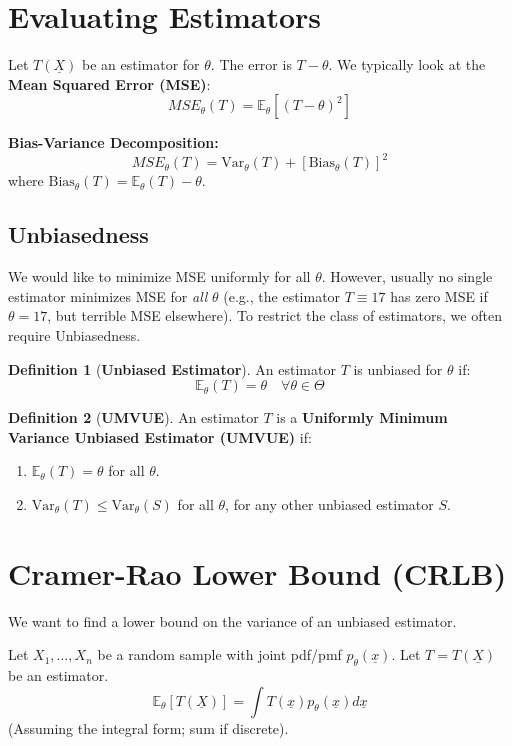 \documentclass[12pt, a4paper]{article}
\theoremstyle{definition}
\newtheorem{definition}{Definition}
\newcommand{\E}{\mathbb{E}}
\newcommand{\Var}{\text{Var}}
\newcommand{\xvec}{\underline{x}}
\newcommand{\Xvec}{\underline{X}}
\begin{document}
\section{Evaluating Estimators}

Let $T(\Xvec)$ be an estimator for $\theta$. The error is $T - \theta$.
We typically look at the \textbf{Mean Squared Error (MSE)}:
$$ MSE_\theta(T) = \E_\theta[(T - \theta)^2] $$

\textbf{Bias-Variance Decomposition:}
$$ MSE_\theta(T) = \Var_\theta(T) + [\text{Bias}_\theta(T)]^2 $$
where $\text{Bias}_\theta(T) = \E_\theta(T) - \theta$.

\subsection{Unbiasedness}
We would like to minimize MSE uniformly for all $\theta$. However, usually no single estimator minimizes MSE for \textit{all} $\theta$ (e.g., the estimator $T \equiv 17$ has zero MSE if $\theta=17$, but terrible MSE elsewhere).
To restrict the class of estimators, we often require Unbiasedness.

\begin{definition}[\textbf{Unbiased Estimator}]
An estimator $T$ is unbiased for $\theta$ if:
$$ \E_\theta(T) = \theta \quad \forall \theta \in \Theta $$
\end{definition}

\begin{definition}[\textbf{UMVUE}]
An estimator $T$ is a \textbf{Uniformly Minimum Variance Unbiased Estimator (UMVUE)} if:
\begin{enumerate}
    \item $\E_\theta(T) = \theta$ for all $\theta$.
    \item $\Var_\theta(T) \le \Var_\theta(S)$ for all $\theta$, for any other unbiased estimator $S$.
\end{enumerate}
\end{definition}

\section{Cramer-Rao Lower Bound (CRLB)}
We want to find a lower bound on the variance of an unbiased estimator.

Let $X_1, \dots, X_n$ be a random sample with joint pdf/pmf $p_\theta(\xvec)$.
Let $T = T(\Xvec)$ be an estimator.
$$ \E_\theta[T(\Xvec)] = \int T(\xvec) p_\theta(\xvec) d\xvec $$
(Assuming the integral form; sum if discrete).
\end{document}
